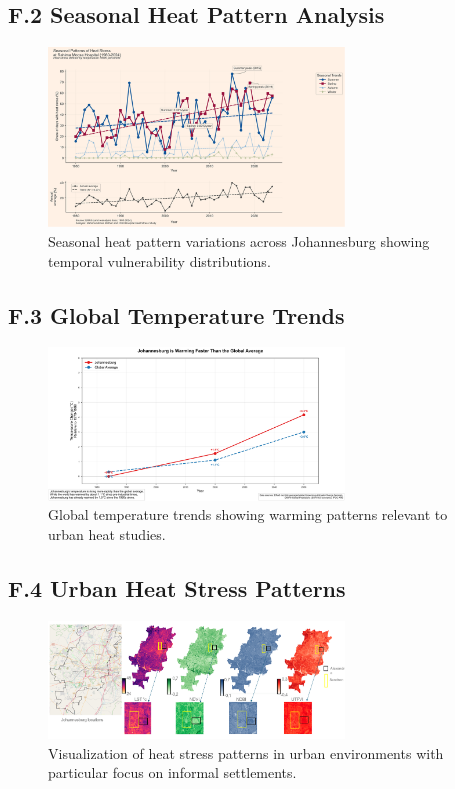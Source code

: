 \documentclass[12pt,a4paper,landscape]{article}
\begin{document}
\subsection*{F.2 Seasonal Heat Pattern Analysis}
\begin{figure}[H]
    \centering
    \includegraphics[width=0.7\textwidth]{images/seasonal_heat_Rahima_1980_2024.png}
    \caption{Seasonal heat pattern variations across Johannesburg showing temporal vulnerability distributions.}
    \label{fig:seasonal}
\end{figure}

\subsection*{F.3 Global Temperature Trends}
\begin{figure}[H]
    \centering
    \includegraphics[width=0.7\textwidth]{images/global_temp_versus_Johannesburg.png}
    \caption{Global temperature trends showing warming patterns relevant to urban heat studies.}
    \label{fig:global_temp}
\end{figure}

\subsection*{F.4 Urban Heat Stress Patterns}
\begin{figure}[H]
    \centering
    \includegraphics[width=0.7\textwidth]{images/heat_stress_LST_NDVI_NDBI_UTFVI_Johannesburg.png}
    \caption{Visualization of heat stress patterns in urban environments with particular focus on informal settlements.}
    \label{fig:heat_stress}
\end{figure}
\end{document}
